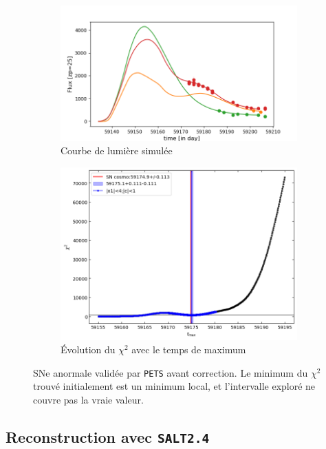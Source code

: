 \documentclass{book}
\def\pets{\texttt{PETS}\xspace}
\def\saltd{\texttt{SALT2.4}\xspace}
\begin{document}
\begin{figure}
	\begin{subfigure}{0.45\textwidth}
		\centering
		\includegraphics[width=\textwidth]{figures/544_lc_truth.png}
		\caption{Courbe de lumière simulée}
	\end{subfigure}
	\hfill
	\begin{subfigure}{0.45\textwidth}
		\centering
		\includegraphics[width=\textwidth]{figures/544_Tmaxgrid.png}
		\caption{Évolution du $\chi^2$ avec le temps de maximum}
	\end{subfigure}
	\caption{SNe anormale validée par \pets avant correction. Le minimum du $\chi^2$ trouvé initialement est un minimum local, et l'intervalle exploré ne couvre pas la vraie valeur. }
	\label{fig:pets_worst}
\end{figure}

\subsection{Reconstruction avec \saltd}
\end{document}
